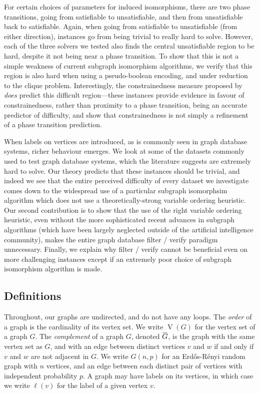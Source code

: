 \documentclass[twoside,11pt]{article}
\newcommand{\citet}[1]{\citeA{#1}}
\newcommand{\shortoverline}[1]{\mkern 1.5mu\overline{\mkern-1.5mu#1\mkern-1.5mu}\mkern 1.5mu}
\begin{document}
For certain choices of parameters for induced isomorphisms, there are two phase transitions, going
from satisfiable to unsatisfiable, and then from unsatisfiable back to satisfiable. Again, when
going from satisfiable to unsatisfiable (from either direction), instances go from being trivial to
really hard to solve. However, each of the three solvers we tested also finds the central
unsatisfiable region to be hard, despite it not being near a phase transition. To show that this is
not a simple weakness of current subgraph isomorphism algorithms, we verify that this region is also
hard when using a pseudo-boolean encoding, and under reduction to the clique problem. Interestingly,
the constrainedness measure proposed by \citet{Gent:1996:Kappa} \emph{does} predict this difficult
region---these instances provide evidence in favour of constrainedness, rather than proximity to a
phase transition, being an accurate predictor of difficulty, and show that constrainedness is not
simply a refinement of a phase transition prediction.

When labels on vertices are introduced, as is commonly seen in graph database systems, richer
behaviour emerges. We look at some of the datasets commonly used to test graph database systems,
which the literature suggests are extremely hard to solve. Our theory predicts that these instances
should be trivial, and indeed we see that the entire perceived difficulty of every dataset we
investigate comes down to the widespread use of a particular subgraph isomorphsim algorithm which
does not use a theoretically-strong variable ordering heuristic. Our second contribution is to show
that the use of the right variable ordering heuristic, even without the more sophisticated recent
advances in subgraph algorithms (which have been largely neglected outside of the artificial
intelligence community), makes the entire graph database filter / verify paradigm unnecessary.
Finally, we explain why filter / verify cannot be beneficial even on more challenging instances
except if an extremely poor choice of subgraph isomorphism algorithm is made.


\subsection{Definitions}

Throughout, our graphs are undirected, and do not have any loops.  The \emph{order} of a graph is
the cardinality of its vertex set. We write $\operatorname{V}(G)$ for the vertex set of a graph $G$.
The \emph{complement} of a graph $G$, denoted $\shortoverline{G}$, is the graph with the same vertex
set as $G$, and with an edge between distinct vertices $v$ and $w$ if and only if $v$ and $w$ are
not adjacent in $G$. We write $G(n, p)$ for an Erd\H{o}s-R\'enyi random graph with $n$ vertices, and
an edge between each distinct pair of vertices with independent probability $p$.  A graph may have
labels on its vertices, in which case we write $\ell(v)$ for the label of a given vertex $v$.
\end{document}

